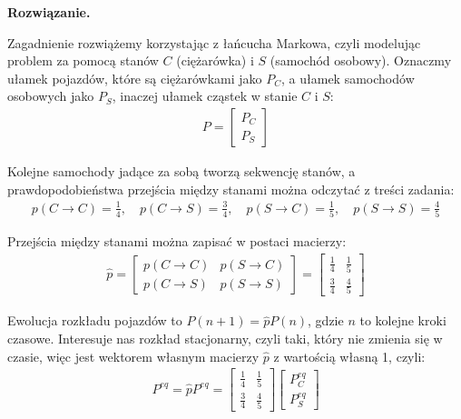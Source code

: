 \documentclass[11pt,a4paper]{article}
\newenvironment{solution}{\vspace{1cm} \par\textbf{Rozwiązanie.} \vspace{1cm}}{}
\begin{document}
\begin{solution}
    
Zagadnienie rozwiążemy korzystając z łańcucha Markowa, czyli modelując 
problem za pomocą stanów $C$ (ciężarówka) i $S$ (samochód osobowy).
Oznaczmy ułamek pojazdów, które są ciężarówkami jako $P_C$, a 
ułamek samochodów osobowych jako $P_S$, inaczej ułamek cząstek 
w stanie $C$ i $S$:
\begin{align*}
    P = \begin{bmatrix}
        P_C \\
        P_S
    \end{bmatrix}
\end{align*}


Kolejne samochody jadące za sobą tworzą sekwencję stanów, a 
prawdopodobieństwa przejścia między stanami można odczytać z treści zadania:
\begin{align*}
    p(C \to C) = \frac{1}{4}, \quad p(C \to S) = \frac{3}{4}, \quad p(S \to C) = \frac{1}{5}, \quad p(S \to S) = \frac{4}{5}
\end{align*}

Przejścia między stanami można zapisać w postaci macierzy:
\begin{align*}
    \hat{p} = \begin{bmatrix}
        p(C \to C) & p(S \to C) \\
        p(C \to S) & p(S \to S)
    \end{bmatrix} = 
    \begin{bmatrix}
        \frac{1}{4} & \frac{1}{5} \\
        \frac{3}{4} & \frac{4}{5}
    \end{bmatrix}
\end{align*}

Ewolucja rozkładu pojazdów to $P(n+1) = \hat{p}P(n)$, gdzie $n$ to kolejne
kroki czasowe.
Interesuje nas rozkład stacjonarny, czyli taki, który nie zmienia się w czasie,
więc jest wektorem własnym macierzy $\hat{p}$ z wartością własną 1, czyli:
\begin{align*}
    P^{eq} = \hat{p} P^{eq} = \begin{bmatrix}
        \frac{1}{4} & \frac{1}{5} \\
        \frac{3}{4} & \frac{4}{5}
    \end{bmatrix} \begin{bmatrix}
        P_C^{eq} \\
        P_S^{eq}
    \end{bmatrix} 
\end{align*}


\end{solution}
\end{document}
